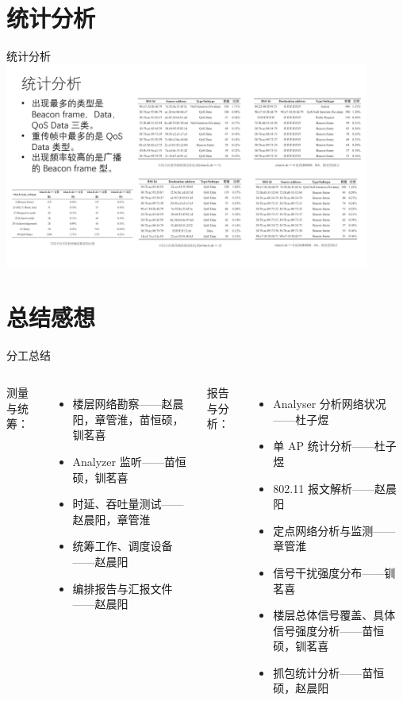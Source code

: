 \documentclass[aspectratio=169]{beamer}
\begin{document}
    \section{统计分析}
    \begin{frame}{统计分析}
      \includegraphics[width=0.9\textwidth]{resources/统计分析.png}
    \end{frame}

    \section{总结感想}
    \begin{frame}{分工总结}
      \begin{columns}[onlytextwidth]
        测量与统筹：
        \begin{itemize}
          \item 楼层网络勘察——赵晨阳，章管淮，苗恒硕，钏茗喜
          \item Analyzer 监听——苗恒硕，钏茗喜
          \item 时延、吞吐量测试——赵晨阳，章管淮
          \item 统筹工作、调度设备——赵晨阳
          \item 编排报告与汇报文件——赵晨阳
        \end{itemize}
        报告与分析：
          \begin{itemize}
            \item Analyser 分析网络状况——杜⼦煜
            \item 单 AP 统计分析——杜⼦煜
            \item 802.11 报文解析——赵晨阳
            \item 定点网络分析与监测——章管淮
            \item 信号干扰强度分布——钏茗喜
            \item 楼层总体信号覆盖、具体信号强度分析——苗恒硕，钏茗喜
            \item 抓包统计分析——苗恒硕，赵晨阳
          \end{itemize}
      \end{columns}
    \end{frame}
\end{document}
